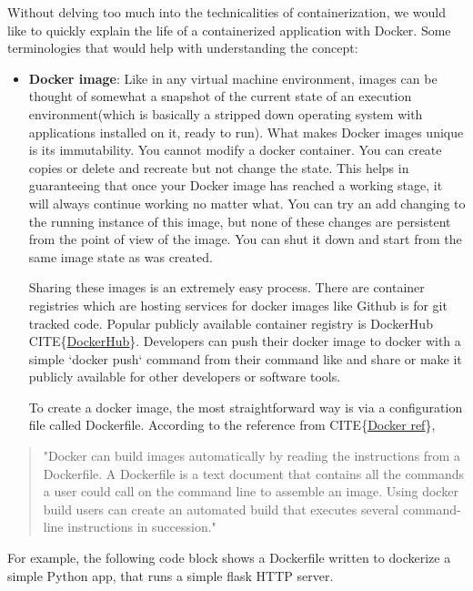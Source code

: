\documentclass[12pt,titlepage]{article}
\begin{document}
Without delving too much into the technicalities of containerization, we would
like to quickly explain the life of a containerized application with Docker.
Some terminologies that would help with understanding the concept:
\begin{itemize}
\item \textbf{Docker image}: Like in any virtual machine environment, images can be thought of somewhat a
snapshot of the current state of an execution environment(which is basically a
stripped down operating system with applications installed on it, ready to run).
What makes Docker images unique is its immutability. You cannot modify a docker
container. You can create copies or delete and recreate but not change the
state. This helps in guaranteeing that once your Docker image has reached a
working stage, it will always continue working no matter what. You can try an
add changing to the running instance of this image, but none of these changes
are persistent from the point of view of the image. You can shut it down and
start from the same image state as was created.

Sharing these images is an extremely easy process. There are container
registries which are hosting services for docker images like Github is for git
tracked code. Popular publicly available container registry is DockerHub
CITE\{\href{https://hub.docker.com/}{DockerHub}\}. Developers can push their docker image to docker with a simple
`docker push` command from their command like and share or make it publicly
available for other developers or software tools.

To create a docker image, the most straightforward way is via a configuration
file called Dockerfile. According to the reference from CITE\{\href{https://docs.docker.com/engine/reference/builder/}{Docker ref}\},
\end{itemize}


\begin{quote}

"Docker can build images automatically by reading the instructions from a
Dockerfile. A Dockerfile is a text document that contains all the commands a
user could call on the command line to assemble an image. Using docker build
users can create an automated build that executes several command-line
instructions in succession."
\end{quote}

For example, the following code block shows a Dockerfile written to dockerize a
simple Python app, that runs a simple flask HTTP server.
\end{document}
